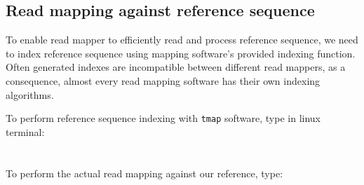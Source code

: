 \subsection{Read mapping against reference sequence}
To enable read mapper to efficiently read and process reference sequence, we need to
index reference sequence using mapping software's provided indexing function. Often generated
indexes are incompatible between different read mappers, as a consequence, almost every read
mapping software has their own indexing algorithms.

To perform reference sequence indexing with \texttt{tmap} software, type in linux terminal:\\~\\
\texttt{}\\

To perform the actual read mapping against our reference, type:\\~\\
\\
\\
